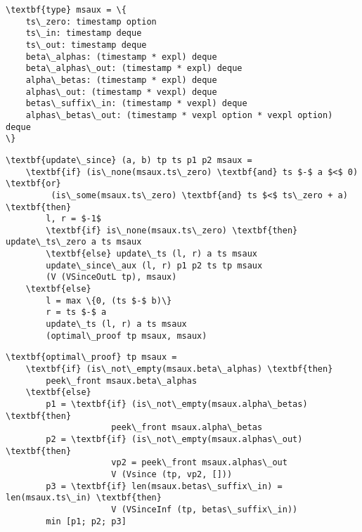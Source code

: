 \documentclass[12pt]{article}
\begin{document}
\thispagestyle{empty}

\begin{Verbatim}[fontfamily=helvetica,fontsize=\small,commandchars=\\\{\},codes={\catcode`$=3\catcode`_=8}]
\textbf{type} msaux = \{
    ts\_zero: timestamp option
    ts\_in: timestamp deque
    ts\_out: timestamp deque
    beta\_alphas: (timestamp * expl) deque
    beta\_alphas\_out: (timestamp * expl) deque
    alpha\_betas: (timestamp * expl) deque
    alphas\_out: (timestamp * vexpl) deque
    betas\_suffix\_in: (timestamp * vexpl) deque
    alphas\_betas\_out: (timestamp * vexpl option * vexpl option) deque
\}
\end{Verbatim}

\begin{Verbatim}[fontfamily=helvetica,fontsize=\small,commandchars=\\\{\},codes={\catcode`$=3\catcode`_=8}]
\textbf{update\_since} (a, b) tp ts p1 p2 msaux =
    \textbf{if} (is\_none(msaux.ts\_zero) \textbf{and} ts $-$ a $<$ 0) \textbf{or}
         (is\_some(msaux.ts\_zero) \textbf{and} ts $<$ ts\_zero + a) \textbf{then}
        l, r = $-1$
        \textbf{if} is\_none(msaux.ts\_zero) \textbf{then} update\_ts\_zero a ts msaux
        \textbf{else} update\_ts (l, r) a ts msaux
        update\_since\_aux (l, r) p1 p2 ts tp msaux
        (V (VSinceOutL tp), msaux)
    \textbf{else}
        l = max \{0, (ts $-$ b)\}
        r = ts $-$ a
        update\_ts (l, r) a ts msaux
        (optimal\_proof tp msaux, msaux)
\end{Verbatim}

\begin{Verbatim}[fontfamily=helvetica,fontsize=\small,commandchars=\\\{\},codes={\catcode`$=3\catcode`_=8}]
\textbf{optimal\_proof} tp msaux =
    \textbf{if} (is\_not\_empty(msaux.beta\_alphas) \textbf{then}
        peek\_front msaux.beta\_alphas
    \textbf{else}
        p1 = \textbf{if} (is\_not\_empty(msaux.alpha\_betas) \textbf{then}
                     peek\_front msaux.alpha\_betas
        p2 = \textbf{if} (is\_not\_empty(msaux.alphas\_out) \textbf{then}
                     vp2 = peek\_front msaux.alphas\_out
                     V (Vsince (tp, vp2, []))
        p3 = \textbf{if} len(msaux.betas\_suffix\_in) = len(msaux.ts\_in) \textbf{then}
                     V (VSinceInf (tp, betas\_suffix\_in))
        min [p1; p2; p3]
\end{Verbatim}

\clearpage
\end{document}
